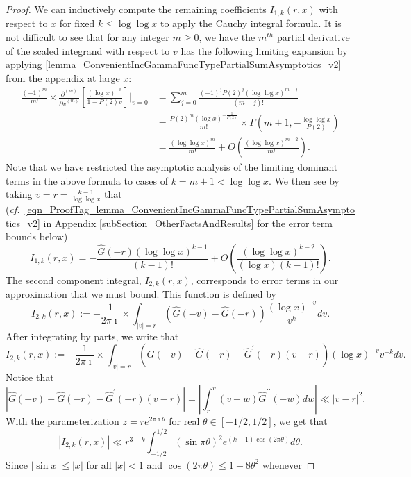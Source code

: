 \documentclass[11pt,reqno,a4letter]{article}
\numberwithin{figure}{section}
\numberwithin{table}{section}
\newcommand{\cf}{\textit{cf.\ }}
\theoremstyle{plain}
\numberwithin{theorem}{section}
\theoremstyle{definition}
\begin{document}
\begin{proof}
We can inductively compute the remaining coefficients 
$I_{1,k}(r, x)$ with respect to 
$x$ for fixed $k \leq \log\log x$ to apply the Cauchy integral formula. 
It is not difficult to see that for any integer $m \geq 0$, 
we have the $m^{th}$ partial derivative of the scaled integrand with respect to $v$ 
has the following limiting expansion by applying 
\eqref{lemma_ConvenientIncGammaFuncTypePartialSumAsymptotics_v2} from the appendix at large $x$: 
\begin{align*} 
\frac{(-1)^m}{m!} \times \frac{\partial^{(m)}}{{\partial v}^{(m)}}\left[ 
     \frac{(\log x)^{-v}}{1 - P(2) v}\right] \Biggr\rvert_{v=0} & = 
     \sum_{j=0}^{m} \frac{(-1)^{j} P(2)^{j} (\log\log x)^{m-j}}{(m-j)!} \\ 
     & = 
     \frac{P(2)^{m} (\log x)^{-\frac{1}{P(2)}}}{m!} \times 
     \Gamma\left(m+1, -\frac{\log\log x}{P(2)}\right) \\ 
     & = \frac{(\log\log x)^m}{m!} + O\left(\frac{(\log\log x)^{m-2}}{m!}\right). 
\end{align*} 
Note that we have restricted the asymptotic analysis of the limiting dominant terms in 
the above formula to cases of $k = m + 1 < \log\log x$. 
We then see by taking $v = r = \frac{k-1}{\log\log x}$ that 
(\cf \eqref{eqn_ProofTag_lemma_ConvenientIncGammaFuncTypePartialSumAsymptotics_v2} 
in Appendix \ref{subSection_OtherFactsAndResults} for the error term bounds below) 
\[
I_{1,k}(r, x) = -\frac{\widehat{G}(-r) (\log\log x)^{k-1}}{(k-1)!} + O\left(
     \frac{(\log\log x)^{k-2}}{(\log x) (k-1)!}\right). 
\]
The second component integral, $I_{2,k}(r, x)$, corresponds to error terms in our approximation 
that we must bound. This function is defined by 
\[
I_{2,k}(r, x) := -\frac{1}{2\pi\imath} \times \int_{|v|=r} (\widehat{G}(-v) - \widehat{G}(-r)) 
     \frac{(\log x)^{-v}}{v^k} dv. 
\]
After integrating by parts, we write that 
\[
I_{2,k}(r, x) := -\frac{1}{2\pi\imath} \times \int_{|v|=r} (\widehat{G}(-v) - \widehat{G}(-r) - 
     \widehat{G}^{\prime}(-r)(v-r)) 
     (\log x)^{-v} v^{-k} dv. 
\]
Notice that 
\[
\left\lvert \widehat{G}(-v) - \widehat{G}(-r) - \widehat{G}^{\prime}(-r)(v-r) \right\rvert = 
     \left\lvert \int_{r}^{v} 
     (v-w) \widehat{G}^{\prime\prime}(-w) dw \right\rvert 
     \ll |v-r|^2. 
\]
With the parameterization $z = r e^{2\pi\imath\theta}$ for real $\theta \in [-1/2,1/2]$, 
we get that 
\[
|I_{2,k}(r, x)| \ll r^{3-k} \int_{-1/2}^{1/2} (\sin \pi\theta)^2 e^{(k-1) \cos(2\pi\theta)} d\theta. 
\]
Since $|\sin x| \leq |x|$ for all $|x| < 1$ and $\cos(2\pi\theta) \leq 1 - 8\theta^2$ whenever 

\end{proof}
\end{document}
